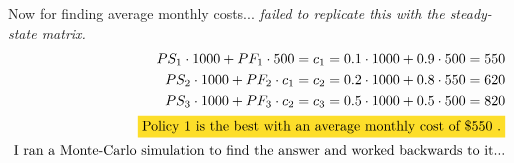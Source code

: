 \documentclass{article}
\begin{document}
\begin{enumerate}
Now for finding average monthly costs...  \emph{failed to replicate this with the steady-state matrix.}
\begin{align}
  PS_1 \cdot 1000 + PF_1 \cdot 500 = c_1 = 0.1 \cdot 1000 + 0.9  \cdot  500 = 550 \nonumber \\
  PS_2 \cdot 1000 + PF_2 \cdot c_1 = c_2 = 0.2 \cdot 1000 + 0.8 \cdot 550 = 620 \nonumber \\
  PS_3 \cdot 1000 + PF_3 \cdot c_2 = c_3 = 0.5 \cdot 1000 + 0.5 \cdot 500 = 820 \nonumber \\
  \colorbox{Goldenrod}{Policy 1 is the best with an average monthly cost of \$550 \nonumber.}\\
  \text{I ran a Monte-Carlo simulation to find the answer and worked backwards to it...}\nonumber
\end{align}
\end{enumerate}
\end{document}
